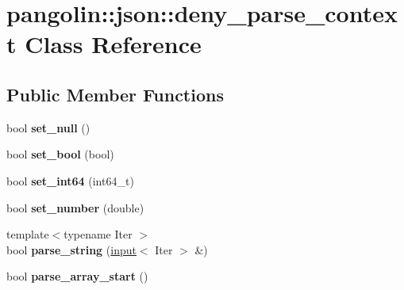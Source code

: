 \hypertarget{classpangolin_1_1json_1_1deny__parse__context}{}\section{pangolin\+:\+:json\+:\+:deny\+\_\+parse\+\_\+context Class Reference}
\label{classpangolin_1_1json_1_1deny__parse__context}
\subsection*{Public Member Functions}
\begin{DoxyCompactItemize}
\item 
bool {\bfseries set\+\_\+null} ()\hypertarget{classpangolin_1_1json_1_1deny__parse__context_a07620ca4144014ef0898e32542217822}{}\label{classpangolin_1_1json_1_1deny__parse__context_a07620ca4144014ef0898e32542217822}

\item 
bool {\bfseries set\+\_\+bool} (bool)\hypertarget{classpangolin_1_1json_1_1deny__parse__context_a005cc5974f95b47fcd36427327579318}{}\label{classpangolin_1_1json_1_1deny__parse__context_a005cc5974f95b47fcd36427327579318}

\item 
bool {\bfseries set\+\_\+int64} (int64\+\_\+t)\hypertarget{classpangolin_1_1json_1_1deny__parse__context_ae1ce69cb97773c70255d1edb3f6f54b2}{}\label{classpangolin_1_1json_1_1deny__parse__context_ae1ce69cb97773c70255d1edb3f6f54b2}

\item 
bool {\bfseries set\+\_\+number} (double)\hypertarget{classpangolin_1_1json_1_1deny__parse__context_abedfc3803d075639fc418f1de540109a}{}\label{classpangolin_1_1json_1_1deny__parse__context_abedfc3803d075639fc418f1de540109a}

\item 
{\footnotesize template$<$typename Iter $>$ }\\bool {\bfseries parse\+\_\+string} (\hyperlink{classpangolin_1_1json_1_1input}{input}$<$ Iter $>$ \&)\hypertarget{classpangolin_1_1json_1_1deny__parse__context_ac188f1020d44c0c0bbc2caf8d9006b39}{}\label{classpangolin_1_1json_1_1deny__parse__context_ac188f1020d44c0c0bbc2caf8d9006b39}

\item 
bool {\bfseries parse\+\_\+array\+\_\+start} ()\hypertarget{classpangolin_1_1json_1_1deny__parse__context_a22cb51c45933b1e3c3fa98583500c055}{}\label{classpangolin_1_1json_1_1deny__parse__context_a22cb51c45933b1e3c3fa98583500c055}


\end{DoxyCompactItemize}
